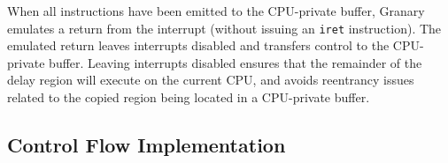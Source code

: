 \documentclass[preprint]{sigplanconf}
\newcommand{\toolname}[1]{{\scshape #1}}
\begin{document}
When all instructions have been emitted to the CPU-private buffer, Granary emulates a return from the interrupt (without issuing an \texttt{iret} instruction). The emulated return leaves interrupts disabled and transfers control to the CPU-private buffer. Leaving interrupts disabled ensures that the remainder of the delay region will execute on the current CPU, and avoids reentrancy issues related to the copied region being located in a CPU-private buffer.




\subsection{Control Flow Implementation}
\end{document}
